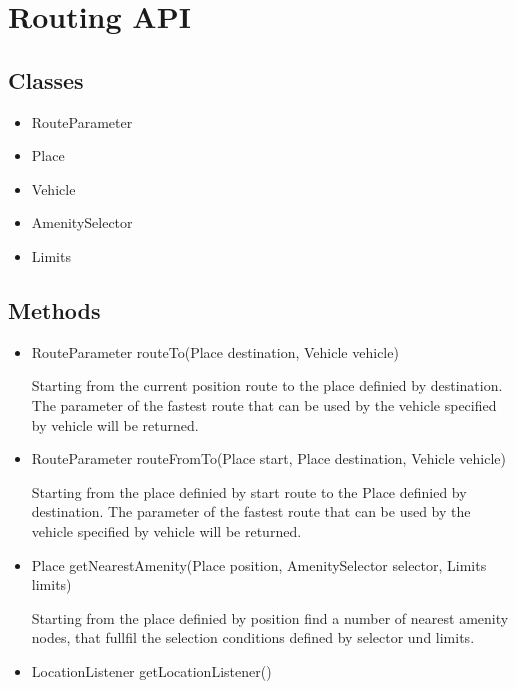\section{Routing API}

\subsection{Classes}

\begin{itemize}

	\item RouteParameter\newline
	\item Place\newline
	\item Vehicle\newline
	\item AmenitySelector\newline
	\item Limits\newline

\end{itemize}

\subsection{Methods}

\begin{itemize}

	\item RouteParameter routeTo(Place destination, Vehicle vehicle)\newline
	
	Starting from the current position route to the place definied by destination. The parameter of the fastest route that can be used by the vehicle specified by vehicle will be returned.	
	
	\item RouteParameter routeFromTo(Place start, Place destination, Vehicle vehicle)\newline
	
	Starting from the place definied by start route to the Place definied by destination. The parameter of the fastest route that can be used by the vehicle specified by vehicle will be returned.
	
	\item Place getNearestAmenity(Place position, AmenitySelector selector, Limits limits)\newline

	Starting from the place definied by position find a number of nearest amenity nodes, that fullfil the selection conditions defined by selector und limits. 
	
	\item LocationListener getLocationListener()\newline
	
	

\end{itemize}
